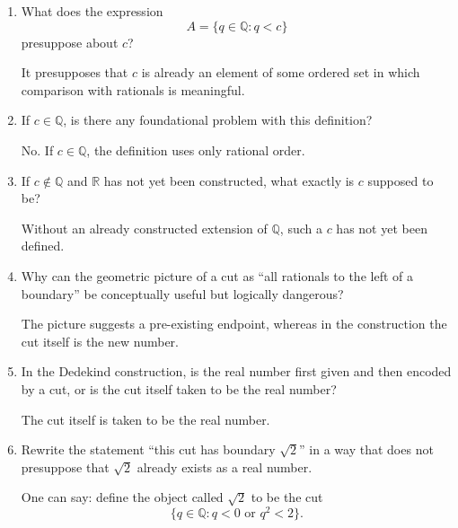 \documentclass{essay}
\begin{document}
\begin{enumerate}[label=\arabic*., itemsep=10pt]

\item What does the expression
\[
A=\{q\in\mathbb{Q}:q<c\}
\]
presuppose about $c$?

\begin{answer}
It presupposes that $c$ is already an element of some ordered set in which comparison with rationals is meaningful.
\end{answer}

\item If $c\in\mathbb{Q}$, is there any foundational problem with this definition?

\begin{answer}
No. If $c\in\mathbb{Q}$, the definition uses only rational order.
\end{answer}

\item If $c\notin\mathbb{Q}$ and $\mathbb{R}$ has not yet been constructed, what exactly is $c$ supposed to be?

\begin{answer}
Without an already constructed extension of $\mathbb{Q}$, such a $c$ has not yet been defined.
\end{answer}

\item Why can the geometric picture of a cut as ``all rationals to the left of a boundary'' be conceptually useful but logically dangerous?

\begin{answer}
The picture suggests a pre-existing endpoint, whereas in the construction the cut itself is the new number.
\end{answer}

\item In the Dedekind construction, is the real number first given and then encoded by a cut, or is the cut itself taken to be the real number?

\begin{answer}
The cut itself is taken to be the real number.
\end{answer}

\item Rewrite the statement
``this cut has boundary $\sqrt{2}$''
in a way that does not presuppose that $\sqrt{2}$ already exists as a real number.

\begin{answer}
One can say: define the object called $\sqrt2$ to be the cut
\[
\{q\in\mathbb{Q}:q<0\text{ or }q^2<2\}.
\]
\end{answer}


\end{enumerate}
\end{document}
